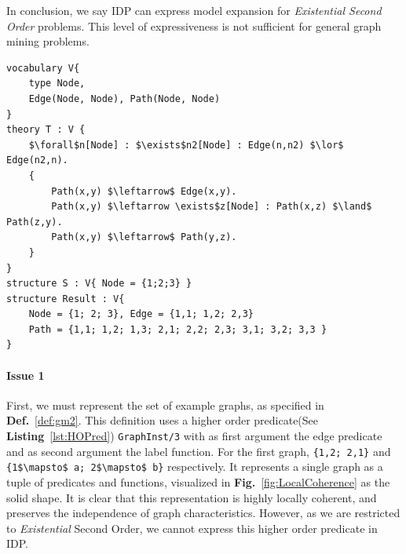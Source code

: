 In conclusion, we say IDP can express model expansion for \emph{Existential Second Order} problems.
This level of expressiveness is not sufficient for general graph mining problems.


\begin{lstlisting}[mathescape,style=model,caption={IDP example using inductive definitions}, label=lst:vocabularyExample]
vocabulary V{
    type Node, 
    Edge(Node, Node), Path(Node, Node)
}
theory T : V {
    $\forall$n[Node] : $\exists$n2[Node] : Edge(n,n2) $\lor$ Edge(n2,n).
    {
        Path(x,y) $\leftarrow$ Edge(x,y).
        Path(x,y) $\leftarrow \exists$z[Node] : Path(x,z) $\land$ Path(z,y).
        Path(x,y) $\leftarrow$ Path(y,z).
    }
}
structure S : V{ Node = {1;2;3} }
structure Result : V{
    Node = {1; 2; 3}, Edge = {1,1; 1,2; 2,3}
    Path = {1,1; 1,2; 1,3; 2,1; 2,2; 2,3; 3,1; 3,2; 3,3 }
}
\end{lstlisting}


\paragraph{Issue 1}
First, we must represent the set of example graphs, as specified in \textbf{Def.}~\ref{def:gm2}. 
This definition uses a higher order predicate(See \textbf{Listing}~\ref{lst:HOPred}) \lstinline{GraphInst/3} with as first argument the edge predicate and as second argument the label function. For the first graph, \lstinline|{1,2; 2,1}| and \lstinline[mathescape]|{1$\mapsto$ a; 2$\mapsto$ b}| respectively.
It represents a single graph as a tuple of predicates and functions, visualized in \textbf{Fig.}~\ref{fig:LocalCoherence} as the solid shape.
It is clear that this representation is highly locally coherent, and preserves the independence of graph characteristics.
However, as we are restricted to \emph{Existential} Second Order, we cannot express this higher order predicate in IDP.


